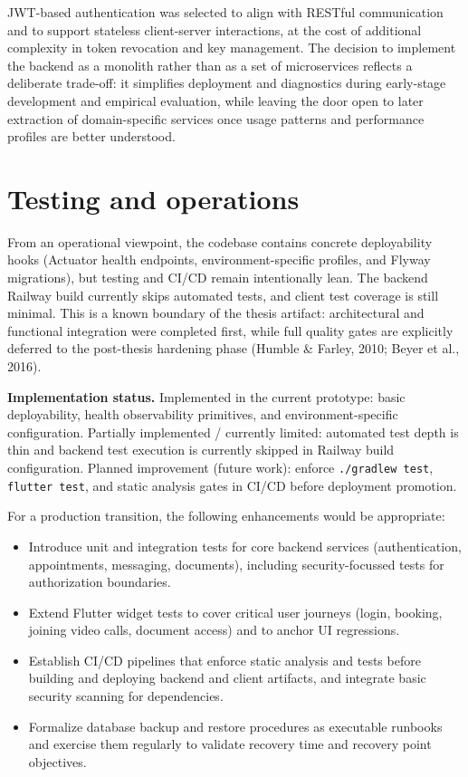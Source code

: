 \documentclass[11pt,a4paper,twoside,openany,headings=normal]{scrreprt}
\begin{document}
JWT-based authentication was selected to align with RESTful communication and to support stateless client-server interactions, at the cost of additional complexity in token revocation and key management. The decision to implement the backend as a monolith rather than as a set of microservices reflects a deliberate trade-off: it simplifies deployment and diagnostics during early-stage development and empirical evaluation, while leaving the door open to later extraction of domain-specific services once usage patterns and performance profiles are better understood.

\section{Testing and operations}

From an operational viewpoint, the codebase contains concrete deployability hooks (Actuator health endpoints, environment-specific profiles, and Flyway migrations), but testing and CI/CD remain intentionally lean. The backend Railway build currently skips automated tests, and client test coverage is still minimal. This is a known boundary of the thesis artifact: architectural and functional integration were completed first, while full quality gates are explicitly deferred to the post-thesis hardening phase (Humble \& Farley, 2010; Beyer et al., 2016).

\textbf{Implementation status.} Implemented in the current prototype: basic deployability, health observability primitives, and environment-specific configuration. Partially implemented / currently limited: automated test depth is thin and backend test execution is currently skipped in Railway build configuration. Planned improvement (future work): enforce \texttt{./gradlew test}, \texttt{flutter test}, and static analysis gates in CI/CD before deployment promotion.

For a production transition, the following enhancements would be appropriate:

\begin{itemize}[leftmargin=*]
  \item Introduce unit and integration tests for core backend services (authentication, appointments, messaging, documents), including security-focussed tests for authorization boundaries.
  \item Extend Flutter widget tests to cover critical user journeys (login, booking, joining video calls, document access) and to anchor UI regressions.
  \item Establish CI/CD pipelines that enforce static analysis and tests before building and deploying backend and client artifacts, and integrate basic security scanning for dependencies.
  \item Formalize database backup and restore procedures as executable runbooks and exercise them regularly to validate recovery time and recovery point objectives.
\end{itemize}
\end{document}
